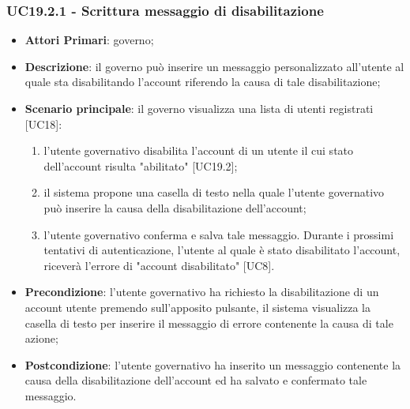 \subsubsection{UC19.2.1 - Scrittura messaggio di disabilitazione}
\begin{itemize}
	\item \textbf{Attori Primari}:
	governo;
	\item \textbf{Descrizione}: il governo può inserire un messaggio personalizzato all'utente al quale sta disabilitando l'account riferendo la causa di tale disabilitazione;
	\item \textbf{Scenario principale}: il governo visualizza una lista di utenti registrati [UC18]:
	\begin{enumerate}[label=\alph*.]
		\item l'utente governativo disabilita l'account di un utente il cui stato dell'account risulta "abilitato" [UC19.2];
		\item il sistema propone una casella di testo nella quale l'utente governativo può inserire la causa della disabilitazione dell'account;
		\item l'utente governativo conferma e salva tale messaggio. Durante i prossimi tentativi di autenticazione, l'utente al quale è stato disabilitato l'account, riceverà l'errore di "account disabilitato" [UC8].
	\end{enumerate}
	 
	\item \textbf{Precondizione}: l'utente governativo ha richiesto la disabilitazione di un account utente premendo sull'apposito pulsante, il sistema visualizza la casella di testo per inserire il messaggio di errore contenente la causa di tale azione;
	\item \textbf{Postcondizione}: l'utente governativo ha inserito un messaggio contenente la causa della disabilitazione dell'account ed ha salvato e confermato tale messaggio.
\end{itemize}


